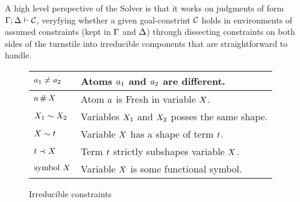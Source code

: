 \documentclass[english, mgr]{iithesis}
\newcommand{\solverRule}{\vdash}
\begin{document}
A high level perspective of the Solver is that it works on judgments of form
$\cEnv; \icEnv \solverRule \sconstr$, veryfying  whether a given goal-constrint $\mathcal{C}$
holds in environments of assumed constraints (kept in $\Gamma$ and $\Delta$)
through dissecting constraints on both sides of the turnstile into
irreducible components that are straightforward to handle.
\begin{figure}
  \centering
  \begin{tabularx}{\textwidth}{|l|X|}
    \hline
    $a_1 \neq a_2$
    & Atoms $a_1$ and $a_2$ are different.
    \\ \hline
    $a   \,\#\, X$
    & Atom $a$ is {Fresh} in variable $X$.
    \\ \hline
    $X_1 \sim  X_2$
    & Variables $X_1$ and $X_2$ posses the same shape.
    \\ \hline
    $X   \sim  t$
    & Variable $X$ has a shape of term $t$.
    \\ \hline
    $t    \prec  X$
    & Term $t$ strictly subshapes variable $X$.
    \\ \hline
    $\text{symbol } X$
    & Variable $X$ is some functional symbol.
    \\ \hline
  \end{tabularx}
  \caption{Irreducible constraints}
  \label{fig:irreducible-constraints}
\end{figure}

\pagebreak
\end{document}
